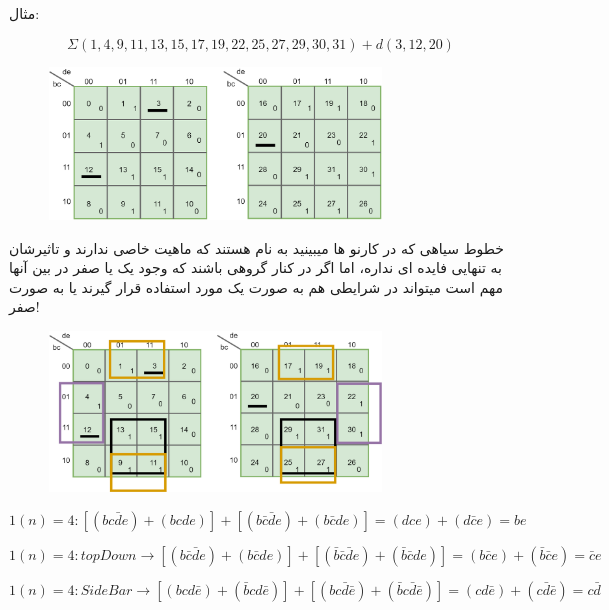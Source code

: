 \documentclass[20pt, a4paper]{article}
\begin{document}
مثال:

\begin{equation}
	\Sigma(1, 4, 9, 11, 13, 15, 17, 19, 22, 25, 27, 29, 30, 31) + d(3, 12, 20)
\end{equation}


\begin{figure}[htbp]\centering
	\centerline{\includegraphics[width=250pt]{img/karnoughMap/hugeKarnough.png}}
\end{figure}

خطوط سیاهی که در کارنو ها میبینید 
به نام 
هستند که ماهیت خاصی ندارند و تاثیرشان به تنهایی فایده ای نداره،  
اما اگر در کنار گروهی باشند که وجود یک یا صفر در بین آنها مهم است میتواند در شرایطی هم به صورت 
یک مورد استفاده قرار گیرند یا به صورت صفر!


\begin{figure}[htbp]\centering
	\centerline{\includegraphics[width=250pt]{img/karnoughMap/hugeKarnoughGrp1.png}}
\end{figure}


\begin{equation}
	1(n)=4:[(bc\bar{d}e)+(bcde)]+[(b\bar{c}\bar{d}e)+(b\bar{c}de)]= (dce)+(d\bar{c}e) = be
\end{equation}


\begin{equation}
	1(n)=4:topDown \rightarrow [(b\bar{c}\bar{d}e)+(b\bar{c}de)]+[(\bar{b}\bar{c}\bar{d}e)+(\bar{b}\bar{c}de)]=(b\bar{c}e)+(\bar{b}\bar{c}e)=\bar{c}e
\end{equation}

\begin{equation}
	1(n)=4:SideBar \rightarrow [(bcd\bar{e})+(\bar{b}cd\bar{e})] + [(bc\bar{d}\bar{e})+(\bar{b}c\bar{d}\bar{e})] = (cd\bar{e}) + (c\bar{d}\bar{e}) = c\bar{d}
\end{equation}
\end{document}
